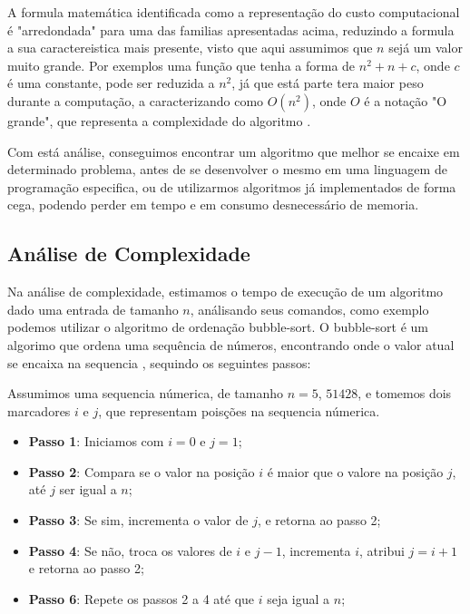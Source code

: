 \documentclass[
	12pt,				%
	openright,			%
	oneside,			%
	a4paper,			%
	english,			%
	brazil				%
	]{abntex2}
\begin{document}
A formula matemática identificada como a representação do custo computacional é "arredondada" para uma das familias
apresentadas acima, reduzindo a formula a sua caractereistica mais presente, visto que aqui assumimos que $n$ sejá
um valor muito grande. Por exemplos uma função que tenha a forma de $n^2 + n + c$, onde $c$ é uma constante, 
pode ser reduzida a $n^2$, já que está parte tera maior peso durante a computação, a caracterizando 
como $O(n^2)$, onde $O$ é a notação "O grande", que representa a complexidade do algoritmo \cite{introductionAlgorthms}.

Com está análise, conseguimos encontrar um algoritmo que melhor se encaixe em determinado problema, antes de se
desenvolver o mesmo em uma linguagem de programação especifica, ou de utilizarmos algoritmos já implementados de forma
cega, podendo perder em tempo e em consumo desnecessário de memoria.

\subsection{Análise de Complexidade}

Na análise de complexidade, estimamos o tempo de execução de um algoritmo dado uma entrada de tamanho $n$, análisando 
seus comandos, como exemplo podemos utilizar o algoritmo de ordenação bubble-sort. O bubble-sort é um algorimo que ordena
uma sequência de números, encontrando onde o valor atual se encaixa na sequencia \cite{introductionAnalysis}, sequindo os seguintes passos:

Assumimos uma sequencia númerica, de tamanho $n=5$, ${5 1 4 2 8}$, e tomemos dois marcadores $i$ e $j$, que representam poisções
na sequencia númerica.

\begin{itemize}
	\item \textbf{Passo 1}: Iniciamos com $i=0$ e $j=1$;
	\item \textbf{Passo 2}: Compara se o valor na posição $i$ é maior que o valore na posição $j$, 
	até $j$ ser igual a $n$;
	\item \textbf{Passo 3}: Se sim, incrementa o valor de $j$, e retorna ao passo 2;
	\item \textbf{Passo 4}: Se não, troca os valores de $i$ e $j-1$, incrementa $i$, atribui $j=i+1$ 
	e retorna ao passo 2;
	\item \textbf{Passo 6}: Repete os passos 2 a 4 até que $i$ seja igual a $n$;
\end{itemize}
\end{document}
